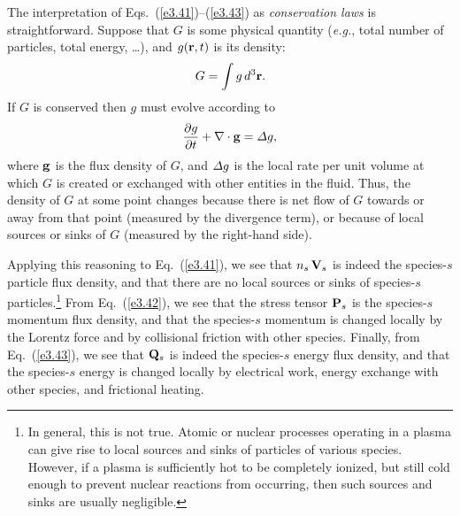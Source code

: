 The interpretation of Eqs.~(\ref{e3.41})--(\ref{e3.43}) as {\em conservation laws}\/ is 
straightforward. Suppose that $G$ is some physical quantity ({\em e.g.},
total number of particles, total energy, \ldots), and $g({\bf r}, t)$
is its density:
\begin{equation}
G = \int g\,d^3{\bf r}.
\end{equation}
If $G$ is conserved then $g$ must evolve according to
\begin{equation}
\frac{\partial g}{\partial t} + \nabla\cdot {\bf g} = {\mit\Delta} g,
\end{equation}
where ${\bf g}$ is the flux density of $G$, and ${\mit\Delta}g$ is the
local rate per unit volume at which $G$ is created or exchanged with other
entities in the fluid. Thus, the density of $G$ at some point
changes because there is net flow of $G$ towards or away from that
point (measured by the divergence term), or because of local
sources or sinks of $G$ (measured by the right-hand side). 

Applying this reasoning to Eq.~(\ref{e3.41}), we see that $n_s\,{\bf V}_s$ is indeed the
species-$s$ particle flux density, and that there are no local sources or sinks of 
species-$s$ particles.\footnote{In general, this is not true. Atomic or nuclear processes
operating in a plasma can give rise to local sources and sinks of particles
of various species. However, if a plasma is sufficiently hot to be completely
ionized, but still cold enough to prevent nuclear reactions from
occurring, then
such sources and sinks are usually negligible.} From Eq.~(\ref{e3.42}), we
see that the stress tensor ${\bf P}_s$ is the species-$s$ momentum flux density, and that 
the species-$s$ momentum is changed locally by the Lorentz force and by collisional
friction with other species. Finally, from Eq.~(\ref{e3.43}), we see that
${\bf Q}_s$ is indeed the species-$s$ energy flux density, and that the
species-$s$ energy is changed locally  by electrical work, energy exchange with
other species, and frictional heating. 

